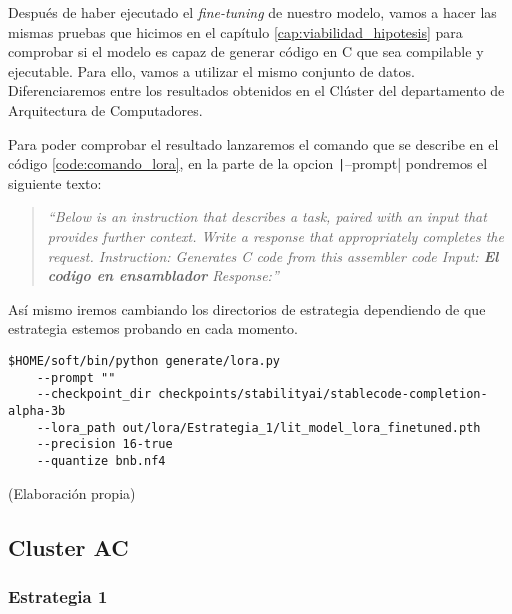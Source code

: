 
Después de haber ejecutado el \textit{fine-tuning} de nuestro modelo, vamos a hacer las mismas pruebas
que hicimos en el capítulo \ref{cap:viabilidad_hipotesis} para comprobar si el modelo es capaz de
generar código en C que sea compilable y ejecutable. Para ello, vamos a utilizar el mismo conjunto
de datos. Diferenciaremos entre los resultados obtenidos en el Clúster del departamento de Arquitectura
de Computadores.

Para poder comprobar el resultado lanzaremos el comando que se describe en el código \ref{code:comando_lora},
en la parte de la opcion \texttt|--prompt| pondremos el siguiente texto:

\begin{quote}
    \textit{``Below is an instruction that describes a task, paired with an input that provides further context.
    Write a response that appropriately completes the request. \newline
    Instruction: Generates C code from this assembler code \newline
    Input: \textbf{El codigo en ensamblador}\newline
    Response:''}
\end{quote}

Así mismo iremos cambiando los directorios de estrategia dependiendo de que estrategia estemos probando
en cada momento.

\begin{mycode}
    \begin{verbatim}
$HOME/soft/bin/python generate/lora.py 
    --prompt "" 
    --checkpoint_dir checkpoints/stabilityai/stablecode-completion-alpha-3b 
    --lora_path out/lora/Estrategia_1/lit_model_lora_finetuned.pth 
    --precision 16-true
    --quantize bnb.nf4

    \end{verbatim}
    \caption[]{ (Elaboración propia)}
    \label{code:comando_lora}
\end{mycode}

\subsection{Cluster AC}
\label{subsec:cluster_ac}

\subsubsection{Estrategia 1}
\label{subsubsec:resultados:estrategia_1}

